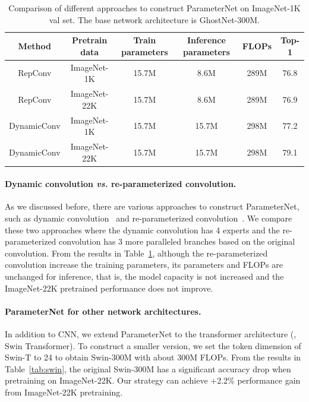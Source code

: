 \documentclass[10pt,twocolumn,letterpaper]{article}
\begin{document}
\begin{table}[htb]
	\centering
	\small
	\renewcommand\arraystretch{1.1}
	\setlength{\tabcolsep}{8pt}
	\caption{Comparison of different approaches to construct ParameterNet on ImageNet-1K val set. The base network architecture is GhostNet-300M.}
	\label{tab:rep}
	\begin{tabular}{c|c|cccc}
		\toprule[1.5pt]
		Method & Pretrain data  & Train parameters  & Inference parameters & FLOPs & Top-1  \\
		\midrule
		RepConv & ImageNet-1K &  15.7M & 8.6M & 289M & 76.8 \\
		RepConv & ImageNet-22K &  15.7M & 8.6M & 289M & 76.9 \\
		DynamicConv & ImageNet-1K & 15.7M & 15.7M & 298M & 77.2 \\
		DynamicConv & ImageNet-22K & 15.7M & 15.7M & 298M & 79.1 \\
		\bottomrule[1pt]
	\end{tabular}	
\end{table}


\paragraph{Dynamic convolution \emph{vs.} re-parameterized convolution.}
As we discussed before, there are various approaches to construct ParameterNet, such as dynamic convolution~\cite{dynamic-conv} and re-parameterized convolution~\cite{repvgg}. We compare these two approaches where the dynamic convolution has 4 experts and the re-parameterized convolution has 3 more paralleled branches based on the original convolution. From the results in Table~\ref{tab:rep}, although the re-parameterized convolution increase the training parameters, its parameters and FLOPs are unchanged for inference, that is, the model capacity is not increased and the ImageNet-22K pretrained performance does not improve.


\paragraph{ParameterNet for other network architectures.}
In addition to CNN, we extend ParameterNet to the transformer architecture (\ie, Swin Transformer). To construct a smaller version, we set the token dimension of Swin-T to 24 to obtain Swin-300M with about 300M FLOPs. From the results in Table~\ref{tab:swin}, the original Swin-300M has a significant accuracy drop when pretraining on ImageNet-22K. Our strategy can achieve +2.2\% performance gain from ImageNet-22K pretraining.
\end{document}
